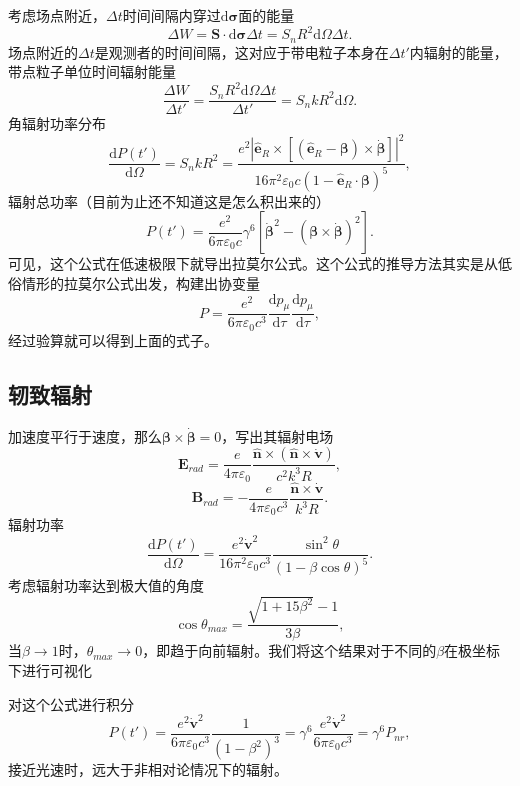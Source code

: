 \documentclass[UTF8]{ctexbook}
\renewcommand{\d}{\mathrm{d}}
\renewcommand{\b}{\boldsymbol}
\numberwithin{equation}{chapter}
\begin{document}
	考虑场点附近，$\Delta t$时间间隔内穿过$\d \b{\sigma}$面的能量
	\[\Delta W=\b{S}\cdot\d \b{\sigma}\Delta t = S_n R^2 \d \Omega \Delta t. \]
	场点附近的$\Delta t$是观测者的时间间隔，这对应于带电粒子本身在$\Delta t'$内辐射的能量，带点粒子单位时间辐射能量
	\[\frac{\Delta W}{\Delta t'}=\frac{S_n R^2 \d\Omega \Delta t}{\Delta t'}=S_n kR^2\d\Omega.\]
	角辐射功率分布
	\[\frac{\d P(t')}{\d \Omega}=S_n kR^2=\frac{ e^2 |\hat{\b{e}}_R\times[(\hat{\b{e}}_R-\b{\beta})\times\dot{\b{\beta}}]|^2}{16\pi^2\varepsilon_0 c(1-\hat{\b{e}}_R\cdot\b{\beta})^5},\]
	辐射总功率（目前为止还不知道这是怎么积出来的）
	\[P(t')=\frac{e^2}{6\pi\varepsilon_0 c}\gamma^6[\dot{\b{\beta}}^2-(\b{\beta}\times\dot{\b{\beta}})^2].\]
	可见，这个公式在低速极限下就导出拉莫尔公式。这个公式的推导方法其实是从低俗情形的拉莫尔公式出发，构建出协变量
	\[P=\frac{e^2}{6\pi\varepsilon_0c^3}\frac{\d p_\mu}{\d \tau}\frac{\d p_\mu}{\d \tau},\]
	经过验算就可以得到上面的式子。
	
	\subsection{轫致辐射}
	
	加速度平行于速度，那么$\b{\beta}\times\dot{\b{\beta}}=0$，写出其辐射电场
	\[\b{E}_{rad}=\frac{e}{4\pi\varepsilon_0}\frac{\hat{\b{n}}\times(\hat{\b{n}}\times\dot{\b{v}})}{c^2k^3 R},\]
	\[\b{B}_{rad}=-\frac{e}{4\pi\varepsilon_0c^3}\frac{\hat{\b{n}}\times\dot{\b{v}}}{k^3 R}.\]
	辐射功率
	\[\frac{\d P(t')}{\d \Omega}=\frac{e^2\dot{\b{v}}^2}{16\pi^2\varepsilon_0 c^3}\frac{\sin^2\theta}{(1-\beta\cos\theta)^5}.\]
	考虑辐射功率达到极大值的角度
	\[\cos\theta_{max}=\frac{\sqrt{1+15\beta^2}-1}{3\beta},\]
	当$\beta\rightarrow 1$时，$\theta_{max}\rightarrow 0$，即趋于向前辐射。我们将这个结果对于不同的$\beta$在极坐标下进行可视化
	\begin{figure}[H]
		\centering
	\end{figure}
	\begin{figure}[H]
		\centering
	\end{figure}
	
	对这个公式进行积分
	\[P(t')=\frac{e^2\dot{\b{v}}^2}{6\pi\varepsilon_0 c^3}\frac{1}{(1-\beta^2)^3}=\gamma^6 \frac{e^2 \dot{\b{v}}^2}{6\pi\varepsilon_0 c^3} = \gamma^6 P_{nr},\]
	接近光速时，远大于非相对论情况下的辐射。
	
\end{document}

